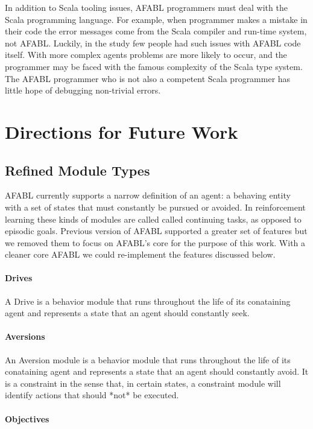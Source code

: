 In addition to Scala tooling issues, AFABL programmers must deal with the Scala programming language. For example, when programmer makes a mistake in their code the error messages come from the Scala compiler and run-time system, not AFABL. Luckily, in the study few people had such issues with AFABL code itself. With more complex agents problems are more likely to occur, and the programmer may be faced with the famous complexity of the Scala type system. The AFABL programmer who is not also a competent Scala programmer has little hope of debugging non-trivial errors.

\section{Directions for Future Work}


\subsection{Refined Module Types}

AFABL currently supports a narrow definition of an agent: a behaving entity with a set of states that must constantly be pursued or avoided. In reinforcement learning these kinds of modules are called called continuing tasks, as opposed to episodic goals. Previous version of AFABL supported a greater set of features but we removed them to focus on AFABL's core for the purpose of this work. With a cleaner core AFABL we could re-implement the features discussed below.

\paragraph{Drives}

A Drive is a behavior module that runs throughout the life of its conataining agent and represents a state that an agent should constantly seek.

\paragraph{Aversions}

An Aversion module is a behavior module that runs throughout the life of its conataining agent and represents a state that an agent should constantly avoid.  It is a constraint in the sense that, in certain states, a constraint module will identify actions that should *not* be executed.

\paragraph{Objectives}

